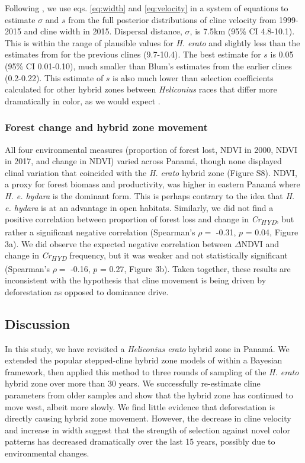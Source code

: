 \documentclass[]{article}
\begin{document}
Following \citet{Blum:2002wr}, we use eqs. \ref{eq:width} and
\ref{eq:velocity} in a system of equations to estimate \(\sigma\) and
\(s\) from the full posterior distributions of cline velocity from
1999-2015 and cline width in 2015. Dispersal distance, \(\sigma\), is
7.5km (95\% CI 4.8-10.1). This is within the range of plausible values
for \textit{H. erato} \citep{Mallet:1986vj, Mallet:1990tn} and slightly
less than the estimates from \citet{Blum:2002wr} for the previous clines
(9.7-10.4). The best estimate for \(s\) is 0.05 (95\% CI 0.01-0.10),
much smaller than Blum's estimates from the earlier clines (0.2-0.22).
This estimate of \(s\) is also much lower than selection coefficients
calculated for other hybrid zones between \textit{Heliconius} races that
differ more dramatically in color, as we would expect
\citep{Mallet:1990tn}.

\subsubsection{Forest change and hybrid zone
movement}\label{forest-change-and-hybrid-zone-movement}

All four environmental measures (proportion of forest lost, NDVI in
2000, NDVI in 2017, and change in NDVI) varied across Panamá, though
none displayed clinal variation that coincided with the
\textit{H. erato} hybrid zone (Figure S8). NDVI, a proxy for forest
biomass and productivity, was higher in eastern Panamá where
\textit{H. e. hydara} is the dominant form. This is perhaps contrary to
the idea that \textit{H. e. hydara} is at an advantage in open habitats.
Similarly, we did not find a positive correlation between proportion of
forest loss and change in \textit{Cr\textsubscript{HYD}}, but rather a
significant negative correlation (Spearman's \(\rho =\) -0.31, \(p\) =
0.04, Figure 3a). We did observe the expected negative correlation
between \(\Delta\)NDVI and change in \textit{Cr\textsubscript{HYD}}
frequency, but it was weaker and not statistically significant
(Spearman's \(\rho =\) -0.16, \(p\) = 0.27, Figure 3b). Taken together,
these results are inconsistent with the hypothesis that cline movement
is being driven by deforestation as opposed to dominance drive.

\subsection{Discussion}\label{discussion}

In this study, we have revisited a \textit{Heliconius erato} hybrid zone
in Panamá. We extended the popular stepped-cline hybrid zone models of
\citet{Szymura:1986cm} within a Bayesian framework, then applied this
method to three rounds of sampling of the \textit{H. erato} hybrid zone
over more than 30 years. We successfully re-estimate cline parameters
from older samples and show that the hybrid zone has continued to move
west, albeit more slowly. We find little evidence that deforestation is
directly causing hybrid zone movement. However, the decrease in cline
velocity and increase in width suggest that the strength of selection
against novel color patterns has decreased dramatically over the last 15
years, possibly due to environmental changes.
\end{document}
